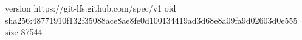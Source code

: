 version https://git-lfs.github.com/spec/v1
oid sha256:48771910f132f35088ace8ae8fe0d100134419ad3d68e8a09fa9d02603d0e555
size 87544
